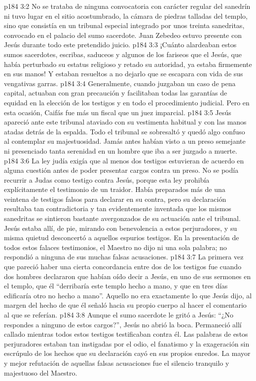 \vs p184 3:2 No se trataba de ninguna convocatoria con carácter regular del sanedrín ni tuvo lugar en el sitio acostumbrado, la cámara de piedras talladas del templo, sino que consistía en un tribunal especial integrado por unos treinta sanedritas, convocado en el palacio del sumo sacerdote. Juan Zebedeo estuvo presente con Jesús durante todo este pretendido juicio.
\vs p184 3:3 ¡Cuánto alardeaban estos sumos sacerdotes, escribas, saduceos y algunos de los fariseos que el Jesús, que había perturbado su estatus religioso y retado su autoridad, ya estaba firmemente en sus manos! Y estaban resueltos a no dejarlo que se escapara con vida de sus vengativas garras.
\vs p184 3:4 Generalmente, cuando juzgaban un caso de pena capital, actuaban con gran precaución y facilitaban todas las garantías de equidad en la elección de los testigos y en todo el procedimiento judicial. Pero en esta ocasión, Caifás fue más un fiscal que un juez imparcial.
\vs p184 3:5 \pc Jesús apareció ante este tribunal ataviado con su vestimenta habitual y con las manos atadas detrás de la espalda. Todo el tribunal se sobresaltó y quedó algo confuso al contemplar su majestuosidad. Jamás antes habían visto a un preso semejante ni presenciado tanta serenidad en un hombre que iba a ser juzgado a muerte.
\vs p184 3:6 \pc La ley judía exigía que al menos dos testigos estuvieran de acuerdo en alguna cuestión antes de poder presentar cargos contra un preso. No se podía recurrir a Judas como testigo contra Jesús, porque esta ley prohibía explícitamente el testimonio de un traidor. Había preparados más de una veintena de testigos falsos para declarar en su contra, pero su declaración resultaba tan contradictoria y tan evidentemente inventada que los mismos sanedritas se sintieron bastante avergonzados de su actuación ante el tribunal. Jesús estaba allí, de pie, mirando con benevolencia a estos perjuradores, y su misma quietud desconcertó a aquellos espurios testigos. En la presentación de todos estos falaces testimonios, el Maestro no dijo ni una sola palabra; no respondió a ninguna de sus muchas falsas acusaciones.
\vs p184 3:7 La primera vez que pareció haber una cierta concordancia entre dos de los testigos fue cuando dos hombres declararon que habían oído decir a Jesús, en uno de sus sermones en el templo, que él “derribaría este templo hecho a mano, y que en tres días edificaría otro no hecho a mano”. Aquello no era exactamente lo que Jesús dijo, al margen del hecho de que él señaló hacia su propio cuerpo al hacer el comentario al que se referían.
\vs p184 3:8 Aunque el sumo sacerdote le gritó a Jesús: “¿No respondes a ninguno de estos cargos?”, Jesús no abrió la boca. Permaneció allí callado mientras todos estos testigos testificaban contra él. Las palabras de estos perjuradores estaban tan instigadas por el odio, el fanatismo y la exageración sin escrúpulo de los hechos que su declaración cayó en sus propios enredos. La mayor y mejor refutación de aquellas falsas acusaciones fue el silencio tranquilo y majestuoso del Maestro.
